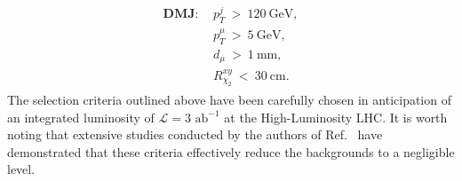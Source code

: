 \documentclass[preprint, superscriptaddress,amsmath, nofootinbib]{revtex4-1}
\begin{document}
\begin{align}
    \begin{split}
        \mathbf{DMJ}:&\ p_T^j\ >\ 120\ \text{GeV}, \\
        &\ p_T^{\mu}\ >\ 5\ \text{GeV}, \\
        &\ d_{\mu} \ > \ 1\ \text{mm}, \\
        &\ R_{\chi_2}^{xy}\ <\ 30\ \text{cm}.
    \end{split}
\end{align}
The selection criteria outlined above have been carefully chosen in anticipation of an integrated luminosity of $\mathcal{L} = 3 \text{ ab}^{-1}$ at the High-Luminosity LHC. It is worth noting that extensive studies conducted by the authors of Ref.~\cite{Izaguirre:2015zva} have demonstrated that these criteria effectively reduce the backgrounds to a negligible level. 
\end{document}
